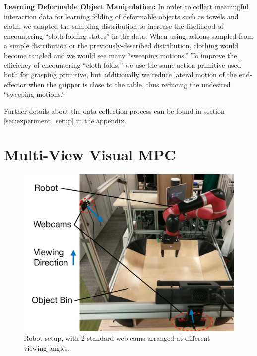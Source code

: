\noindent \textbf{Learning Deformable Object Manipulation:}
In order to collect meaningful interaction data for learning folding of deformable objects such as towels and cloth, we adapted the sampling distribution to increase the likelihood of encountering ``cloth-folding-states'' in the data. When using actions sampled from a simple distribution or the previously-described distribution, clothing would become tangled and we would see many ``sweeping motions.'' To improve the efficiency of encountering ``cloth folds,'' we use the same action primitive used both for grasping primitive,
but additionally we reduce lateral motion of the end-effector when the gripper is close to the table, thus reducing the undesired ``sweeping motions.''

Further details about the data collection process can be found in section \ref{sec:experiment_setup} in the appendix.

\section{Multi-View Visual MPC}
\label{sec:multiview}
\begin{figure}
	\centering
	\includegraphics[width=0.45\columnwidth]{images_general/robot_setup_scheme.pdf}
	\caption{\small{Robot setup, with 2 standard web-cams arranged at different viewing angles.}}	\label{fig:robot_setup}
\end{figure}

